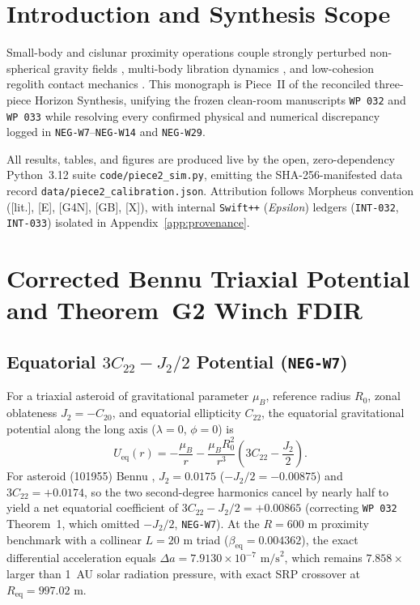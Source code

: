 \documentclass[11pt]{amsart}
\numberwithin{equation}{section}
\theoremstyle{plain}
\theoremstyle{definition}\newtheorem{definition}[theorem]{Definition}
\theoremstyle{remark}\newtheorem{remark}[theorem]{Remark}
\newcommand{\ctag}[1]{\textup{\textsf{\scriptsize[#1]}}}
\begin{document}
\section{Introduction and Synthesis Scope}
Small-body and cislunar proximity operations couple strongly perturbed non-spherical gravity fields \cite{scheeres2012,lauretta2019,scheeres2019}, multi-body libration dynamics \cite{szebehely1967,howell1984,koon2011}, and low-cohesion regolith contact mechanics \cite{lauretta2022,walsh2022}. This monograph is Piece~II of the reconciled three-piece Horizon Synthesis, unifying the frozen clean-room manuscripts \texttt{WP~032} and \texttt{WP~033} \cite{ergentics2026wp032} while resolving every confirmed physical and numerical discrepancy logged in \texttt{NEG-W7}--\texttt{NEG-W14} and \texttt{NEG-W29}.

All results, tables, and figures are produced live by the open, zero-dependency Python~3.12 suite \texttt{code/piece2\_sim.py}, emitting the SHA-256-manifested data record \texttt{data/piece2\_calibration.json}. Attribution follows Morpheus convention (\ctag{lit.}, \ctag{E}, \ctag{G4N}, \ctag{GB}, \ctag{X}), with internal \texttt{Swift++} (\emph{Epsilon}) ledgers (\texttt{INT-032}, \texttt{INT-033}) isolated in Appendix~\ref{app:provenance}.

\section{Corrected Bennu Triaxial Potential and Theorem~G2 Winch FDIR}
\subsection{Equatorial \texorpdfstring{$3C_{22} - J_2/2$}{3C22 - J2/2} Potential (\texttt{NEG-W7})}
For a triaxial asteroid of gravitational parameter $\mu_B$, reference radius $R_0$, zonal oblateness $J_2 = -C_{20}$, and equatorial ellipticity $C_{22}$, the equatorial gravitational potential along the long axis ($\lambda = 0$, $\phi = 0$) is \cite{scheeres2012}
\begin{equation}\label{eq:bennu_pot}
U_{\mathrm{eq}}(r) = -\frac{\mu_B}{r} - \frac{\mu_B R_0^2}{r^3}\left(3 C_{22} - \frac{J_2}{2}\right).
\end{equation}
For asteroid (101955) Bennu \cite{scheeres2019}, $J_2 = 0.0175$ ($-J_2/2 = -0.00875$) and $3 C_{22} = +0.0174$, so the two second-degree harmonics cancel by nearly half to yield a net equatorial coefficient of $3 C_{22} - J_2/2 = +0.00865$ (correcting \texttt{WP~032} Theorem~1, which omitted $-J_2/2$, \texttt{NEG-W7}). At the $R = 600\text{ m}$ proximity benchmark with a collinear $L = 20\text{ m}$ triad ($\beta_{\mathrm{eq}} = 0.004362$), the exact differential acceleration equals $\Delta a = 7.9130\times 10^{-7}\text{ m/s}^2$, which remains $7.858\times$ larger than 1~AU solar radiation pressure, with exact SRP crossover at $R_{\mathrm{eq}} = 997.02\text{ m}$.
\end{document}
